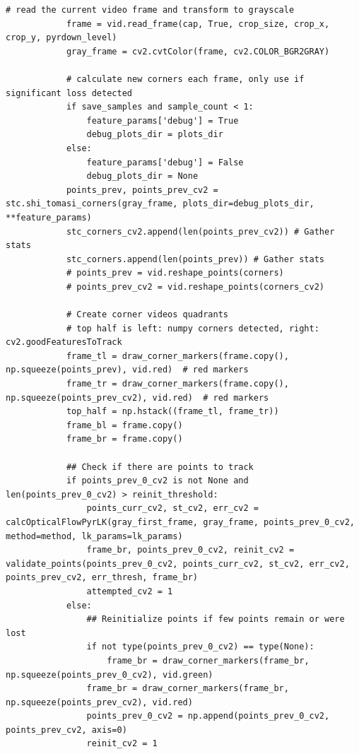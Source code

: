 \documentclass[11pt, conference, letterpaper]{IEEEtran}
\begin{document}
\begin{lstlisting}[style=python, caption={\texttt{lucas\_kanade.py}}, label={lst:lk}]
            # read the current video frame and transform to grayscale        
            frame = vid.read_frame(cap, True, crop_size, crop_x, crop_y, pyrdown_level)
            gray_frame = cv2.cvtColor(frame, cv2.COLOR_BGR2GRAY)
            
            # calculate new corners each frame, only use if significant loss detected
            if save_samples and sample_count < 1:
                feature_params['debug'] = True
                debug_plots_dir = plots_dir
            else:
                feature_params['debug'] = False
                debug_plots_dir = None
            points_prev, points_prev_cv2 = stc.shi_tomasi_corners(gray_frame, plots_dir=debug_plots_dir, **feature_params)
            stc_corners_cv2.append(len(points_prev_cv2)) # Gather stats
            stc_corners.append(len(points_prev)) # Gather stats
            # points_prev = vid.reshape_points(corners)
            # points_prev_cv2 = vid.reshape_points(corners_cv2)
    
            # Create corner videos quadrants
            # top half is left: numpy corners detected, right: cv2.goodFeaturesToTrack 
            frame_tl = draw_corner_markers(frame.copy(), np.squeeze(points_prev), vid.red)  # red markers
            frame_tr = draw_corner_markers(frame.copy(), np.squeeze(points_prev_cv2), vid.red)  # red markers
            top_half = np.hstack((frame_tl, frame_tr))
            frame_bl = frame.copy()
            frame_br = frame.copy()
            
            ## Check if there are points to track
            if points_prev_0_cv2 is not None and len(points_prev_0_cv2) > reinit_threshold:
                points_curr_cv2, st_cv2, err_cv2 = calcOpticalFlowPyrLK(gray_first_frame, gray_frame, points_prev_0_cv2, method=method, lk_params=lk_params)
                frame_br, points_prev_0_cv2, reinit_cv2 = validate_points(points_prev_0_cv2, points_curr_cv2, st_cv2, err_cv2, points_prev_cv2, err_thresh, frame_br)
                attempted_cv2 = 1
            else:
                ## Reinitialize points if few points remain or were lost
                if not type(points_prev_0_cv2) == type(None):
                    frame_br = draw_corner_markers(frame_br, np.squeeze(points_prev_0_cv2), vid.green)
                frame_br = draw_corner_markers(frame_br, np.squeeze(points_prev_cv2), vid.red)
                points_prev_0_cv2 = np.append(points_prev_0_cv2, points_prev_cv2, axis=0)
                reinit_cv2 = 1
            

\end{lstlisting}
\end{document}
